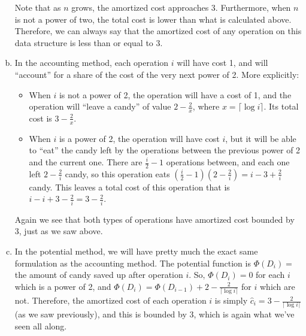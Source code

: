\documentclass[fleqn]{homework}
\begin{document}
\begin{problem}{5}
\begin{enumerate}[a.]
      Note that as $n$ grows, the amortized cost approaches 3.  Furthermore,
      when $n$ is not a power of two, the total cost is lower than what is
      calculated above.  Therefore, we can always say that the amortized cost of
      any operation on this data structure is less than or equal to 3.
    \item In the accounting method, each operation $i$ will have cost 1, and
      will ``account'' for a share of the cost of the very next power of 2.
      More explicitly:
      \begin{itemize}
      \item When $i$ is not a power of 2, the operation will have a cost of 1,
        and the operation will ``leave a candy'' of value $2 - \frac{2}{x}$,
        where $x = \lceil \log i \rceil$.  Its total cost is $3 - \frac{2}{x}$.
      \item When $i$ is a power of 2, the operation will have cost $i$, but it
        will be able to ``eat'' the candy left by the operations between the
        previous power of 2 and the current one.  There are $\frac{i}{2} - 1$
        operations between, and each one left $2 - \frac{2}{i}$ candy, so this
        operation eats
        $\left(\frac{i}{2} - 1\right)\left(2 - \frac{2}{i}\right) = i - 3 +
        \frac{2}{i}$
        candy.  This leaves a total cost of this operation that is
        $i - i + 3 - \frac{2}{i} = 3 - \frac{2}{i}$.
      \end{itemize}

      Again we see that both types of operations have amortized cost bounded by
      3, just as we saw above.
    \item In the potential method, we will have pretty much the exact same
      formulation as the accounting method.  The potential function is
      $\Phi(D_i) =$ the amount of candy saved up after operation $i$.  So,
      $\Phi(D_i) = 0$ for each $i$ which is a power of 2, and
      $\Phi(D_i) = \Phi(D_{i-1}) + 2 - \frac{2}{\lceil \log i \rceil}$ for $i$
      which are not.  Therefore, the amortized cost of each operation $i$ is
      simply $\hat{c}_i = 3 - \frac{2}{\lceil \log i\rceil}$ (as we saw
      previously), and this is bounded by 3, which is again what we've seen all
      along.
    \end{enumerate}
  \end{problem}
\end{document}
